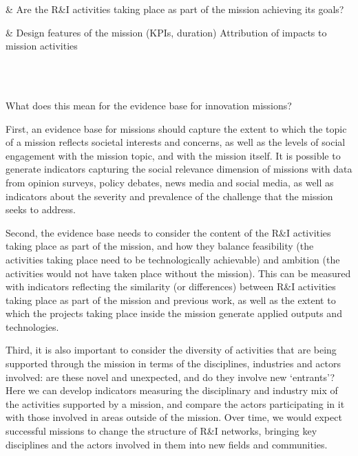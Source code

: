 \documentclass[11pt]{article}
\begin{document}
\begin{table}[!]
\begin{tabu}
 & Are the R\&I activities taking place as part of the mission achieving its goals?
 
 & Design features of the mission (KPIs, duration)
 \newline 
 \newline Attribution of impacts to mission activities
 
 \\
 \\
 \hline
\end{tabu}
\caption{Mission goals, measurements and indicators, based on (cite Mazzucatto)}
\label{tab:criteria}
\end{table}

What does this mean for the evidence base for innovation missions?

First, an evidence base for missions should capture the extent to which the topic of a mission reflects societal interests and concerns, as well as the levels of social engagement with the mission topic, and with the mission itself. It is possible to generate indicators capturing the social relevance dimension of missions with data from opinion surveys, policy debates, news media and social media, as well as indicators about the severity and prevalence of the challenge that the mission seeks to address.

Second, the evidence base needs to consider the content of the R\&I activities taking place as part of the mission, and how they balance feasibility (the activities taking place need to be technologically achievable) and ambition (the activities would not have taken place without the mission). This can be measured with indicators reflecting the similarity (or differences) between R&I activities taking place as part of the mission and previous work, as well as the extent to which the projects taking place inside the mission generate applied outputs and technologies.

Third, it is also important to consider the diversity of activities that are being supported through the mission in terms of the disciplines, industries and actors involved: are these novel and unexpected, and do they involve new `entrants’? Here we can develop indicators measuring the disciplinary and industry mix of the activities supported by a mission, and compare the actors participating in it with those involved in areas outside of the mission. Over time, we would expect successful missions to change the structure of R&I networks, bringing key disciplines and the actors involved in them into new fields and communities.
\end{document}
